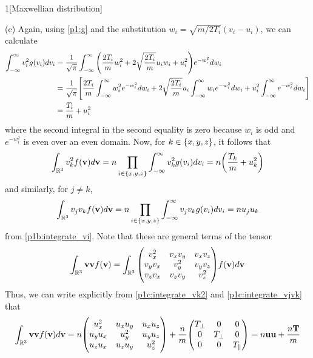 \documentclass[12pt]{article}
\begin{document}
\begin{problem}{1}[Maxwellian distribution]
\begin{solution}
    (c) Again, using \eqref{p1:g} and the substitution
    $w_i=\sqrt{m/2T_i}(v_i-u_i)$, we can calculate
    \begin{align}
        \int_{-\infty}^\infty v_i^2g(v_i)dv_i
        &=\frac1{\sqrt\pi}\int_{-\infty}^\infty
            \qty(\frac{2T_i}{m}w_i^2+2\sqrt{\frac{2T_i}{m}}u_iw_i+u_i^2)
            e^{-w_i^2}dw_i\notag\\
        &=\frac1{\sqrt\pi}\qty[
            \frac{2T_i}{m}\int_{-\infty}^\infty w_i^2e^{-w_i^2}dw_i
            +2\sqrt{\frac{2T_i}{m}}u_i\int_{-\infty}^\infty w_ie^{-w_i^2}dw_i
            +u_i^2\int_{-\infty}^\infty e^{-w_i^2}dw_i
        ]\notag\\
        &=\frac{T_i}{m}+u_i^2
    \end{align}
    where the second integral in the second equality is zero because $w_i$
    is odd and $e^{-w_i^2}$ is even over an even domain. Now, for
    $k\in\qty{x,y,z}$, it follows that
    \begin{align}\label{p1c:integrate_vk2}
        \int_{\mathbb{R}^3}v_k^2f(\vb{v})d\vb{v}
        =n\prod_{i\in\qty{x,y,z}}\int_{-\infty}^\infty v_k^2g(v_i)dv_i
        =n\qty(\frac{T_k}{m}+u_k^2)
    \end{align}
    and similarly, for $j\neq k$,
    \begin{align}\label{p1c:integrate_vjvk}
        \int_{\mathbb{R}^3}v_jv_kf(\vb{v})d\vb{v}
        =n\prod_{i\in\qty{x,y,z}}\int_{-\infty}^\infty v_jv_kg(v_i)dv_i
        =nu_ju_k
    \end{align}
    from \eqref{p1b:integrate_vi}. Note that these are general terms of the
    tensor
    \begin{equation}\label{p1c:tensor}
        \int_{\R^3}\vb{v}\vb{v}f(\vb{v})
        =\int_{\R^3}\mqty(
            v_x^2 & v_xv_y & v_xv_z\\
            v_yv_x&v_y^2&v_yv_z\\
            v_zv_x&v_zv_y&v_z^2
            )f(\vb{v})d\vb{v}
    \end{equation}
    Thus, we can write explicitly from \eqref{p1c:integrate_vk2}
    and \eqref{p1c:integrate_vjvk} that
    \begin{equation}
        \int_{\R^3}\vb{v}\vb{v}f(\vb{v})d\vb{v}
        =n\mqty(
            u_x^2 &u_xu_y &u_xu_z\\
            u_yu_x&u_y^2&u_yu_z\\
            u_zu_x&u_zu_y&u_z^2
            )+\frac{n}{m}\mqty(
                T_\perp&0&0\\
                0&T_\perp&0\\
                0&0&T_\|
            )
            =n\vb{u}\vb{u}+\frac{n\vb{T}}{m}
    \end{equation}


\end{solution}
\end{problem}
\end{document}
